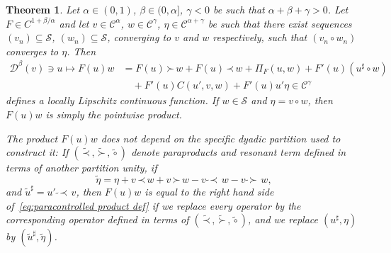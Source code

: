 \documentclass[a4paper,11pt]{article}
\newtheorem{theorem}{Theorem}[section]
\theoremstyle{remark}
\newcommand{\CC}{\ensuremath{\mathscr{C}}}
\newcommand{\CD}{\ensuremath{\mathscr{D}}}
\newcommand{\CS}{\ensuremath{\mathscr{S}}}
\newcommand{\lpara}{\,\mathord{\prec}\,}
\newcommand{\rpara}{\,\mathord{\succ}\,}
\newcommand{\reso}{\,\mathord{\circ}\,}
\begin{document}
\begin{theorem}\label{theorem:product operator}
  Let $\alpha \in (0,1)$, $\beta \in (0,\alpha]$, $\gamma < 0$ be such that $\alpha + \beta + \gamma >0$. Let $F \in C^{1+\beta/\alpha}$ and let $v \in \CC^\alpha$, $w \in \CC^\gamma$, $\eta \in \CC^{\alpha+\gamma}$ be such that there exist sequences $(v_n) \subseteq \CS$, $(w_n) \subseteq \CS$, converging to $v$ and $w$ respectively, such that $(v_n \reso w_n)$ converges to $\eta$. Then
  \begin{align}\label{eq:paracontrolled product def}
     \CD^\beta(v) \ni u \mapsto F(u) w  & = F(u)\rpara w + F(u) \lpara w + \Pi_F(u,w) + F'(u) (u^\sharp \reso w) \\ \nonumber
     &\quad + F'(u) C(u', v, w) + F'(u) u' \eta \in \CC^\gamma
  \end{align}
  defines a locally Lipschitz continuous function. If $w \in \CS$ and $\eta = v \reso w$, then $F(u) w$ is simply the pointwise product.
  
  The product $F(u)w$ does not depend on the specific dyadic partition used to construct it: If $(\widetilde{\lpara}, \widetilde{\rpara}, \widetilde{\reso})$ denote paraproducts and resonant term defined in terms of another partition unity, if
  \[
     \tilde \eta = \eta + v \lpara w + v \rpara w - v \ \widetilde \lpara \ w - v \ \widetilde \rpara \ w,
  \]
  and $\tilde{u}^\sharp = u' \ \widetilde \lpara \ v$, then $F(u) w$ is equal to the right hand side of~\eqref{eq:paracontrolled product def} if we replace every operator by the corresponding operator defined in terms of $(\widetilde{\lpara}, \widetilde{\rpara}, \widetilde{\reso})$, and we replace $(u^\sharp,\eta)$ by $(\tilde{u}^\sharp,\tilde \eta)$.
\end{theorem}
\end{document}
